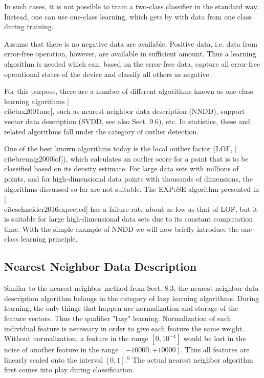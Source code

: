 \documentclass[10pt]{book}
\begin{document}
In such cases, it is not possible to train a two-class classifier in the standard way. Instead, one can use one-class learning, which gets by with data from one class during training.

Assume that there is no negative data are available. Positive data, i.e. data from error-free operation, however, are available in sufficient amount. Thus a learning algorithm is needed which can, based on the error-free data, capture all error-free operational states of the device and classify all others as negative.

For this purpose, there are a number of different algorithms known as one-class learning algorithms [\\cite{tax2001one}], such as nearest neighbor data description (NNDD), support vector data description (SVDD, see also Sect. 9.6), etc. In statistics, these and related algorithms fall under the category of outlier detection.

One of the best known algorithms today is the local outlier factor (LOF, [\\cite{breunig2000lof}]), which calculates an outlier score for a point that is to be classified based on its density estimate. For large data sets with millions of points, and for high-dimensional data points with thousands of dimensions, the algorithms discussed so far are not suitable. The EXPoSE algorithm presented in [\\cite{schneider2016expected}] has a failure rate about as low as that of LOF, but it is suitable for large high-dimensional data sets due to its constant computation time. With the simple example of NNDD we will now briefly introduce the one-class learning principle.

\subsection{Nearest Neighbor Data Description}
Similar to the nearest neighbor method from Sect. 8.3, the nearest neighbor data description algorithm belongs to the category of lazy learning algorithms. During learning, the only things that happen are normalization and storage of the feature vectors. Thus the qualifier "lazy" learning. Normalization of each individual feature is necessary in order to give each feature the same weight. Without normalization, a feature in the range $\left[0,10^{-4}\right]$ would be lost in the noise of another feature in the range $[-10000,+10000]$. Thus all features are linearly scaled onto the interval $[0,1] .^{9}$ The actual nearest neighbor algorithm first comes into play during classification.
\end{document}

